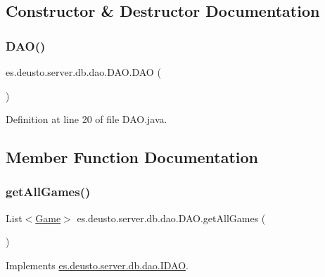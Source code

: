 \subsection{Constructor \& Destructor Documentation}
\mbox{\label{classes_1_1deusto_1_1server_1_1db_1_1dao_1_1_d_a_o_a1f12a4ca454651d41896e45c42db8f90}} 
\subsubsection{\texorpdfstring{D\+A\+O()}{DAO()}}
{\footnotesize\ttfamily es.\+deusto.\+server.\+db.\+dao.\+D\+A\+O.\+D\+AO (\begin{DoxyParamCaption}{ }\end{DoxyParamCaption})}



Definition at line 20 of file D\+A\+O.\+java.



\subsection{Member Function Documentation}
\mbox{\label{classes_1_1deusto_1_1server_1_1db_1_1dao_1_1_d_a_o_af49ed57bdac4dec48ab7616602d12df2}} 
\subsubsection{\texorpdfstring{get\+All\+Games()}{getAllGames()}}
{\footnotesize\ttfamily List$<$\hyperlink{classes_1_1deusto_1_1server_1_1db_1_1data_1_1_game}{Game}$>$ es.\+deusto.\+server.\+db.\+dao.\+D\+A\+O.\+get\+All\+Games (\begin{DoxyParamCaption}{ }\end{DoxyParamCaption})}



Implements \hyperlink{interfacees_1_1deusto_1_1server_1_1db_1_1dao_1_1_i_d_a_o_aebafef372cf3064b12d16fcb651b41ff}{es.\+deusto.\+server.\+db.\+dao.\+I\+D\+AO}.



